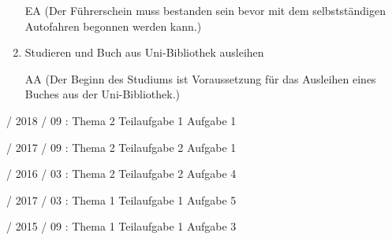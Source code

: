 \documentclass{lehramt-informatik-haupt}
\begin{document}
\begin{enumerate}
\begin{antwort}
EA (Der Führerschein muss bestanden sein bevor mit dem selbstständigen
Autofahren begonnen werden kann.)
\end{antwort}


\item Studieren und Buch aus Uni-Bibliothek ausleihen

\begin{antwort}
AA (Der Beginn des Studiums ist Voraussetzung für das Ausleihen eines
Buches aus der Uni-Bibliothek.)
\end{antwort}
\end{enumerate}

%

 / 2018 / 09 : Thema 2 Teilaufgabe 1 Aufgabe 1

%

 / 2017 / 09 : Thema 2 Teilaufgabe 2 Aufgabe 1

%

 / 2016 / 03 : Thema 2 Teilaufgabe 2 Aufgabe 4

%

 / 2017 / 03 : Thema 1 Teilaufgabe 1 Aufgabe 5

%

 / 2015 / 09 : Thema 1 Teilaufgabe 1 Aufgabe 3

\literatur
\end{document}
